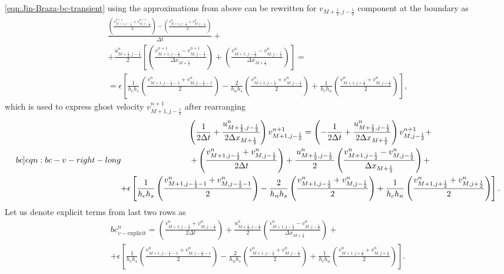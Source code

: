 \documentclass{article}
\numberwithin{equation}{section}
\begin{document}
\cref{eqn:Jin-Braza-bc-transient} using the approximations from above can be rewritten for $v_{M+\frac{1}{2},j-\frac{1}{2}}$ component at the boundary as
\begin{equation*}
\begin{gathered}
\frac{{\left( \frac{v^{n+1}_{M+1,j-\frac{1}{2}}+v^{n+1}_{M,j-\frac{1}{2}}}{2}\right)}-\left( \frac{v^n_{M+1,j-\frac{1}{2}}+v^n_{M,j-\frac{1}{2}}}{2} \right) }{\Delta t}+\\
+\frac{\left.u^n_{M+\frac{1}{2},j-\frac{1}{2}}\right.}{2}
\left[
\left(
	\frac{v^{n+1}_{M+1,j-\frac{1}{2}}-v^{n+1}_{M,j-\frac{1}{2}}}{\Delta x_{M+\frac{1}{2}}}
\right) \right.
+\left.\left(
	\frac{v^{n}_{M+1,j-\frac{1}{2}}-v^{n}_{M,j-\frac{1}{2}}}{\Delta x_{M+\frac{1}{2}}}
\right)
\right]= \\
=\epsilon\left[\frac{1}{h_c h_s}\left(\frac{v^{n}_{M+1,j-\frac{1}{2}-1}+v^{n}_{M,j-\frac{1}{2}-1}}{2} \right) - \frac{2}{h_n h_s}\left(\frac{v^{n}_{M+1,j-\frac{1}{2}}+v^{n}_{M,j-\frac{1}{2}}}{2} \right) + \frac{1}{h_c h_n}\left(\frac{v^{n}_{M+1,j+\frac{1}{2}}+v^{n}_{M,j+\frac{1}{2}}}{2} \right)\right],
\end{gathered}
\end{equation*}
which is used to express ghost velocity $v^{n+1}_{M+1,j-\frac{1}{2}}$ after rearranging
\begin{equation}\label[bc]{eqn:bc-v-right-long}
\begin{gathered}
\left( \frac{1}{2\Delta t} + \frac{u^n_{M+\frac{1}{2},j-\frac{1}{2}}}{2\Delta x_{M+\frac{1}{2}}}\right) v^{n+1}_{M+1,j-\frac{1}{2}}
=\left( -\frac{1}{2\Delta t}+\frac{u^n_{M+\frac{1}{2},j-\frac{1}{2}}}{2\Delta x_{M+\frac{1}{2}}} \right)v^{n+1}_{M,j-\frac{1}{2}}+\\
+\left( \frac{v^n_{M+1,j-\frac{1}{2}}+v^n_{M,j-\frac{1}{2}}}{2\Delta t} \right)
+ \frac{\left.u^n_{M+\frac{1}{2},j-\frac{1}{2}}\right.}{2}\left(\frac{v^{n}_{M+1,j-\frac{1}{2}}-v^{n}_{M,j-\frac{1}{2}}}{\Delta x_{M+\frac{1}{2}}}\right)+\\
+\epsilon\left[\frac{1}{h_c h_s}\left(\frac{v^{n}_{M+1,j-\frac{1}{2}-1}+v^{n}_{M,j-\frac{1}{2}-1}}{2} \right) - \frac{2}{h_n h_s}\left(\frac{v^{n}_{M+1,j-\frac{1}{2}}+v^{n}_{M,j-\frac{1}{2}}}{2} \right) + \frac{1}{h_c h_n}\left(\frac{v^{n}_{M+1,j+\frac{1}{2}}+v^{n}_{M,j+\frac{1}{2}}}{2} \right)\right].
\end{gathered}
\end{equation}
Let us denote explicit terms from last two rows as
\begin{equation*}
\begin{gathered}
	bc_{v-\text{explicit}}^n=\left( \frac{v^n_{M+1,j-\frac{1}{2}}+v^n_{M,j-\frac{1}{2}}}{2\Delta t} \right)
+ \frac{\left.u^n_{M+\frac{1}{2},j-\frac{1}{2}}\right.}{2}\left(\frac{v^{n}_{M+1,j-\frac{1}{2}}-v^{n}_{M,j-\frac{1}{2}}}{\Delta x_{M+\frac{1}{2}}}\right)+\\
+\epsilon\left[\frac{1}{h_c h_s}\left(\frac{v^{n}_{M+1,j-\frac{1}{2}-1}+v^{n}_{M,j-\frac{1}{2}-1}}{2} \right) - \frac{2}{h_n h_s}\left(\frac{v^{n}_{M+1,j-\frac{1}{2}}+v^{n}_{M,j-\frac{1}{2}}}{2} \right) + \frac{1}{h_c h_n}\left(\frac{v^{n}_{M+1,j+\frac{1}{2}}+v^{n}_{M,j+\frac{1}{2}}}{2} \right)\right].
\end{gathered}
\end{equation*}
\end{document}
